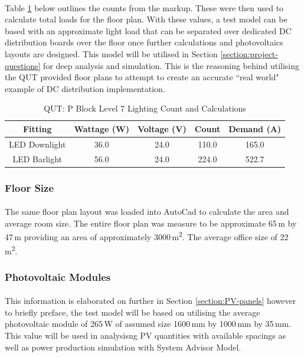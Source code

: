 \paragraph{}
Table \ref{table:QUTlvl7-count} below outlines the counts from the markup. These were then used to calculate total loads for the floor plan. With these values, a test model can be based with an approximate light load that can be separated over dedicated DC distribution boards over the floor once further calculations and photovoltaics layouts are designed. This model will be utilised in Section \ref{section:project-questions} for deep analysis and simulation. This is the reasoning behind utilising the QUT provided floor plans to attempt to create an accurate ``real world" example of DC distribution implementation.     

\begin{table}[!ht]
	\centering
	\renewcommand{\arraystretch}{2}
	\begin{tabular}{|c|c|c|c|c|}
		\hline
		\textbf{Fitting} & \textbf{Wattage (W)} & \textbf{Voltage (V)} & \textbf{Count} & \textbf{Demand (A)} \\ \hline
		LED Downlight & 36.0 & 24.0 & 110.0 & 165.0 \\ \hline
		LED Barlight & 56.0 & 24.0 & 224.0 & 522.7 \\ \hline
	\end{tabular}

	\caption{QUT: P Block Level 7 Lighting Count and Calculations}
	\label{table:QUTlvl7-count}
\end{table}

\subsubsection{Floor Size}

\paragraph{}
The same floor plan layout was loaded into AutoCad to calculate the area and average room size. The entire floor plan was measure to be approximate 65\,m by 47\,m providing an area of approximately 3000\,\si{m^2}. The average office size of 22\,\si{m^2}. 

\subsubsection{Photovoltaic Modules}

\paragraph{}
This information is elaborated on further in Section \ref{section:PV-panels} however to briefly preface, the test model will be based on utilising the average photovoltaic module of 265\,W of assumed size 1600\,mm by 1000\,mm by 35\,mm. This value will be used in analysisng PV quantities with available spacings as well as power production simulation with System Advisor Model. 

